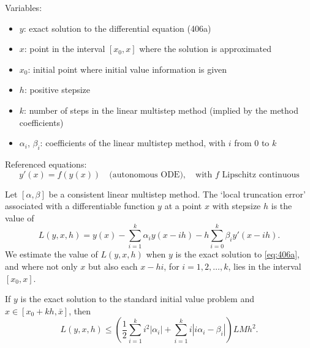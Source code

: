 Variables:
\begin{itemize}
    \item $y$: exact solution to the differential equation (406a)
    \item $x$: point in the interval $[x_0, x]$ where the solution is approximated
    \item $x_0$: initial point where initial value information is given
    \item $h$: positive stepsize
    \item $k$: number of steps in the linear multistep method (implied by the method coefficients)
    \item $\alpha_i$, $\beta_i$: coefficients of the linear multistep method, with $i$ from $0$ to $k$
\end{itemize}

Referenced equations:
\begin{equation}
    y'(x) = f(y(x)) \quad \text{(autonomous ODE)}, \quad \text{with } f \text{ Lipschitz continuous}
    \tag{406a}
\end{equation}

\begin{definition}

  \label{def:406A}
Let $[\alpha, \beta]$ be a consistent linear multistep method. The `local truncation error' associated with a differentiable function $y$ at a point $x$ with stepsize $h$ is the value of
\[
L(y, x, h) = y(x) - \sum_{i=1}^{k} \alpha_i y(x - ih) - h \sum_{i=0}^{k} \beta_i y'(x - ih).
\]
We estimate the value of $L(y, x, h)$ when $y$ is the exact solution to \eqref{eq:406a}, and where not only $x$ but also each $x - hi$, for $i = 1, 2, \dots, k$, lies in the interval $[x_0, x]$.
\end{definition}

\begin{lemma}

  \label{lem:406B}
If $y$ is the exact solution to the standard initial value problem and $x \in [x_0 + kh, \bar{x}]$, then
\[
L(y, x, h) \leq \left( \frac{1}{2} \sum_{i=1}^{k} i^2 |\alpha_i| + \sum_{i=1}^{k} i|i\alpha_i - \beta_i| \right) L M h^2.
\]
\end{lemma}

